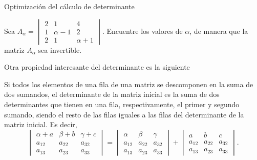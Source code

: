 \begin{subsection}{Optimizaci\'on del c\'alculo de determinante}
\begin{ejer}
Sea $A_\alpha=\begin{vmatrix} 2 & 1 & 4 \\ 1 & \alpha-1 & 2\\ 2 & 1 & \alpha+1  \end{vmatrix}$. Encuentre los valores de $\alpha$, de manera que la matriz $A_\alpha$ sea invertible.
\end{ejer}
Otra propiedad interesante del determinante es la siguiente
\begin{thm}
Si todos los elementos de una fila de una matriz se descomponen en la suma de dos sumandos, el
determinante de la matriz inicial es la suma de dos determinantes que tienen en una fila, respectivamente, el
primer y segundo sumando, siendo el resto de las filas iguales a las filas del determinante de la matriz inicial. Es decir,
\[\begin{vmatrix} \alpha+ a & \beta + b & \gamma + c \\ a_{12} & a_{22}  & a_{32}  \\  a_{13} & a_{23}  & a_{33} \end{vmatrix}=\begin{vmatrix} \alpha& \beta  & \gamma  \\ a_{12} & a_{22}  & a_{32}  \\  a_{13} & a_{23}  & a_{33} \end{vmatrix}+\begin{vmatrix}  a &  b &  c \\ a_{12} & a_{22}  & a_{32}  \\  a_{13} & a_{23}  & a_{33} \end{vmatrix}.\]
\end{thm}
\end{subsection}



